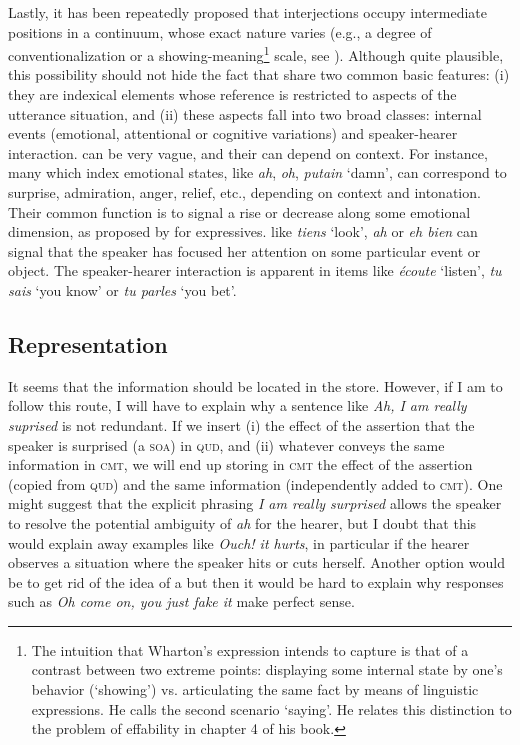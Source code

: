 \documentclass[output=paper,colorlinks,citecolor=brown]{langscibook}
\begin{document}
Lastly, it has been repeatedly proposed that interjections occupy intermediate positions in a continuum, whose exact nature varies (e.g., a degree of conventionalization or a showing-meaning\footnote{The intuition that Wharton's expression intends to capture is that of a contrast between two extreme points: displaying some internal state by one's behavior (`showing') vs. articulating the same fact by means of linguistic expressions. He calls the second scenario `saying'. He relates this distinction to the problem of effability in chapter 4 of his book.} scale, see \citealt[chapter 4]{Wharton:2009}). Although quite plausible, this possibility should not hide the fact that  share two common basic features: (i) they are indexical elements whose reference is restricted to aspects of the utterance situation, and (ii) these aspects fall into two broad classes: internal events (emotional, attentional or cognitive variations) and speaker-hearer interaction.  can be very vague, and their  can depend on context. For instance,  many  which index emotional states, like \textit{ah}, \textit{oh}, \textit{putain} `damn', can correspond to surprise, admiration, anger, relief, etc., depending on context and intonation. Their common function is to signal a rise or decrease along some emotional dimension, as proposed by \citet{Potts:2007} for expressives.  like \textit{tiens} `look', \textit{ah} or \textit{eh bien} can signal that the speaker has focused her attention on some particular event or object. The speaker-hearer interaction is apparent in items like \textit{écoute} `listen', \textit{tu sais} `you know' or \textit{tu parles} `you bet'.

\subsection{Representation}
\label{sec-representation2:Jayez}

It seems that the  information should be located in the  store. However, if I am to follow this route, I will have to explain why a sentence like \textit{Ah, I am really suprised} is not redundant. If we insert (i) the effect of the assertion that the speaker is surprised (a \textsc{soa}) in \textsc{qud}, and (ii) whatever conveys the same information in \textsc{cmt}, we will end up storing in \textsc{cmt} the effect of the assertion (copied from \textsc{qud}) and the same information (independently added to \textsc{cmt}). One might suggest that the explicit phrasing \textit{I am really surprised} allows the speaker to resolve the potential ambiguity of \textit{ah} for the hearer, but I doubt that this would explain away examples like \textit{Ouch! it hurts}, in particular if the hearer observes a situation where the speaker hits or cuts herself. Another option would be to get rid of the idea of a  but then it would be hard to explain why responses such as \textit{Oh come on, you just fake it} make perfect sense.
\end{document}

